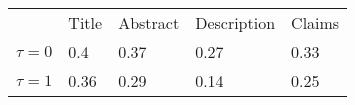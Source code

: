 {

\ttfamily\small

\begin{tabular}{lllll}
\toprule\noalign{\smallskip} 
        & Title & Abstract & Description & Claims\\
\noalign{\smallskip} 
\midrule
\noalign{\smallskip} 

 $\tau=0 $  & 0.4  & 0.37 & 0.27 & 0.33 \\
\hline
$\tau=1 $    & 0.36 & 0.29 & 0.14 & 0.25\\
\bottomrule 
\end{tabular}


}
